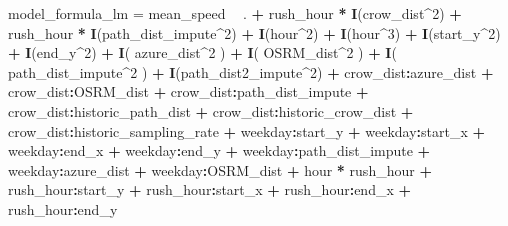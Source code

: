 \documentclass[]{article}
\newenvironment{Shaded}{\begin{snugshade}}{\end{snugshade}}
\newcommand{\DecValTok}[1]{\textcolor[rgb]{0.00,0.00,0.81}{#1}}
\newcommand{\KeywordTok}[1]{\textcolor[rgb]{0.13,0.29,0.53}{\textbf{#1}}}
\newcommand{\NormalTok}[1]{#1}
\newcommand{\OperatorTok}[1]{\textcolor[rgb]{0.81,0.36,0.00}{\textbf{#1}}}
\newcommand{\StringTok}[1]{\textcolor[rgb]{0.31,0.60,0.02}{#1}}
\begin{document}
\begin{Shaded}
\begin{Highlighting}[]
\NormalTok{model_formula_lm =}\StringTok{ }\NormalTok{mean_speed }\OperatorTok{~}\StringTok{ }\NormalTok{. }\OperatorTok{+}
\StringTok{    }\NormalTok{rush_hour }\OperatorTok{*}\StringTok{ }\KeywordTok{I}\NormalTok{(crow_dist}\OperatorTok{^}\DecValTok{2}\NormalTok{) }\OperatorTok{+}
\StringTok{    }\NormalTok{rush_hour }\OperatorTok{*}\StringTok{ }\KeywordTok{I}\NormalTok{(path_dist_impute}\OperatorTok{^}\DecValTok{2}\NormalTok{) }\OperatorTok{+}
\StringTok{    }\KeywordTok{I}\NormalTok{(hour}\OperatorTok{^}\DecValTok{2}\NormalTok{) }\OperatorTok{+}\StringTok{ }\KeywordTok{I}\NormalTok{(hour}\OperatorTok{^}\DecValTok{3}\NormalTok{) }\OperatorTok{+}
\StringTok{    }\KeywordTok{I}\NormalTok{(start_y}\OperatorTok{^}\DecValTok{2}\NormalTok{) }\OperatorTok{+}\StringTok{ }\KeywordTok{I}\NormalTok{(end_y}\OperatorTok{^}\DecValTok{2}\NormalTok{) }\OperatorTok{+}
\StringTok{    }\KeywordTok{I}\NormalTok{( azure_dist}\OperatorTok{^}\DecValTok{2}\NormalTok{ ) }\OperatorTok{+}\StringTok{ }\KeywordTok{I}\NormalTok{( OSRM_dist}\OperatorTok{^}\DecValTok{2}\NormalTok{ ) }\OperatorTok{+}
\StringTok{    }\KeywordTok{I}\NormalTok{( path_dist_impute}\OperatorTok{^}\DecValTok{2}\NormalTok{ ) }\OperatorTok{+}\StringTok{ }\KeywordTok{I}\NormalTok{(path_dist2_impute}\OperatorTok{^}\DecValTok{2}\NormalTok{) }\OperatorTok{+}
\StringTok{    }\NormalTok{crow_dist}\OperatorTok{:}\NormalTok{azure_dist }\OperatorTok{+}\StringTok{ }\NormalTok{crow_dist}\OperatorTok{:}\NormalTok{OSRM_dist }\OperatorTok{+}\StringTok{ }\NormalTok{crow_dist}\OperatorTok{:}\NormalTok{path_dist_impute }\OperatorTok{+}
\StringTok{    }\NormalTok{crow_dist}\OperatorTok{:}\NormalTok{historic_path_dist }\OperatorTok{+}\StringTok{ }\NormalTok{crow_dist}\OperatorTok{:}\NormalTok{historic_crow_dist }\OperatorTok{+}\StringTok{ }\NormalTok{crow_dist}\OperatorTok{:}\NormalTok{historic_sampling_rate }\OperatorTok{+}
\StringTok{    }\NormalTok{weekday}\OperatorTok{:}\NormalTok{start_y }\OperatorTok{+}\StringTok{ }\NormalTok{weekday}\OperatorTok{:}\NormalTok{start_x }\OperatorTok{+}\StringTok{ }\NormalTok{weekday}\OperatorTok{:}\NormalTok{end_x }\OperatorTok{+}\StringTok{ }\NormalTok{weekday}\OperatorTok{:}\NormalTok{end_y }\OperatorTok{+}
\StringTok{    }\NormalTok{weekday}\OperatorTok{:}\NormalTok{path_dist_impute }\OperatorTok{+}\StringTok{ }\NormalTok{weekday}\OperatorTok{:}\NormalTok{azure_dist }\OperatorTok{+}\StringTok{ }\NormalTok{weekday}\OperatorTok{:}\NormalTok{OSRM_dist }\OperatorTok{+}
\StringTok{    }\NormalTok{hour }\OperatorTok{*}\StringTok{ }\NormalTok{rush_hour }\OperatorTok{+}
\StringTok{    }\NormalTok{rush_hour}\OperatorTok{:}\NormalTok{start_y }\OperatorTok{+}\StringTok{ }\NormalTok{rush_hour}\OperatorTok{:}\NormalTok{start_x }\OperatorTok{+}\StringTok{ }\NormalTok{rush_hour}\OperatorTok{:}\NormalTok{end_x }\OperatorTok{+}\StringTok{ }\NormalTok{rush_hour}\OperatorTok{:}\NormalTok{end_y}


\end{Highlighting}
\end{Shaded}
\end{document}
